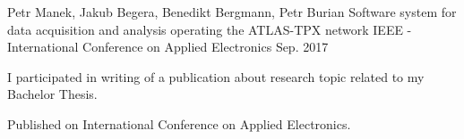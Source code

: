 \begin{cventries}
  \cventry
    {Petr Manek, Jakub Begera, Benedikt Bergmann, Petr Burian}
    {Software system for data acquisition and analysis operating the ATLAS-TPX network}
    {IEEE - International Conference on Applied Electronics}
    {Sep. 2017}
    {
      \begin{cvitems}
        \item {I participated in writing of a publication about research topic related to my Bachelor Thesis.}
        \item {Published on International Conference on Applied Electronics.}
      \end{cvitems}
    }
\end{cventries}
